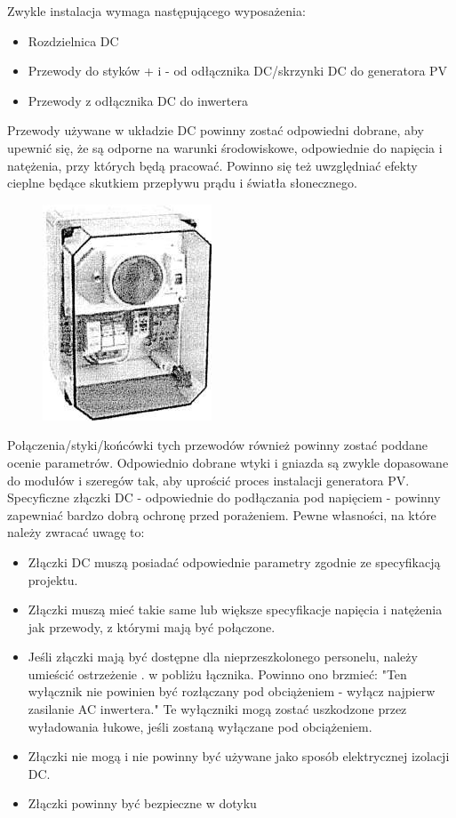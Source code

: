 \documentclass[12pt,a4paper]{article}
\begin{document}
Zwykle instalacja wymaga następującego wyposażenia: 

\begin{itemize}
\item Rozdzielnica DC 
\item Przewody do styków + i - od odłącznika DC/skrzynki DC do 
generatora PV 
\item Przewody z odłącznika DC do inwertera 
\end{itemize}
Przewody używane w układzie DC powinny zostać odpowiedni dobrane, aby 
upewnić się, że są odporne na warunki środowiskowe, odpowiednie do 
napięcia i natężenia, przy których będą pracować. Powinno się też 
uwzględniać efekty cieplne będące skutkiem przepływu prądu i światła 
słonecznego. 

\begin{figure}[h]
\centering
\includegraphics[natwidth=5.03cm,natheight=6.45cm]{media/image14.jpg}
\end{figure}
 


Połączenia/styki/końcówki tych przewodów również powinny zostać poddane 
ocenie parametrów. Odpowiednio dobrane wtyki i gniazda są zwykle 
dopasowane do modułów i szeregów tak, aby uprościć proces instalacji 
generatora PV. Specyficzne złączki DC - odpowiednie do podłączania pod 
napięciem - powinny zapewniać bardzo dobrą ochronę przed porażeniem. 
Pewne własności, na które należy zwracać uwagę to: 

\begin{itemize}
\item Złączki DC muszą posiadać odpowiednie parametry zgodnie ze 
specyfikacją projektu. 
\item Złączki muszą mieć takie same lub większe specyfikacje napięcia i 
natężenia jak przewody, z którymi mają być połączone. 
\item Jeśli złączki mają być dostępne dla nieprzeszkolonego personelu, 
należy umieścić ostrzeżenie . w pobliżu łącznika. Powinno ono brzmieć: 
"Ten wyłącznik nie powinien być rozłączany pod obciążeniem - wyłącz 
najpierw zasilanie AC inwertera." Te wyłączniki mogą zostać uszkodzone 
przez wyładowania łukowe, jeśli zostaną wyłączane pod obciążeniem. 
\item Złączki nie mogą i nie powinny być używane jako sposób 
elektrycznej izolacji DC. 
\item Złączki powinny być bezpieczne w dotyku 
\end{itemize}
 
\end{document}
